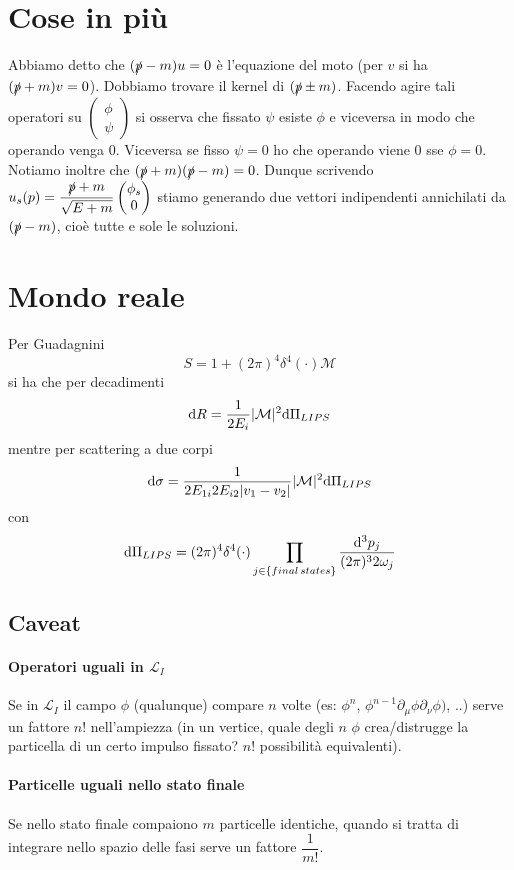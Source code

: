 \documentclass[12pt,a4paper]{article}
\begin{document}
	
	\section{Cose in più}
	Abbiamo detto che $(\slashed{p} -m)u=0$ è l'equazione del moto (per $v$ si ha $(\slashed{p}+m)v=0$). Dobbiamo trovare il kernel di $(\slashed{p}\pm m)$. Facendo agire tali operatori su $\begin{pmatrix}	\phi\\\psi	\end{pmatrix}$ si osserva che fissato $\psi$ esiste $\phi$ e viceversa in modo che operando venga 0. Viceversa se fisso $\psi=0$ ho che operando viene 0 sse $\phi=0$. Notiamo inoltre che $(\slashed{p}+m)(\slashed{p}-m) = 0$. Dunque scrivendo $u_s(p) = \dfrac{\slashed{p}+m}{\sqrt{E+m}} \begin{pmatrix}	\phi_s\\0	\end{pmatrix} $ stiamo generando due vettori indipendenti annichilati da $(\slashed{p}-m)$, cioè tutte e sole le soluzioni.
	
	\section{Mondo reale}
	Per Guadagnini
	\[ S = 1 + (2\pi)^4 \delta^4(\cdot) \mathcal{M} \]
	si ha che per decadimenti
	\[ \mathrm{d} R = \dfrac{1}{2E_i} |\mathcal{M}|^2 \mathrm{d} \Pi_{LIPS} \]
	mentre per scattering a due corpi
	\[ \mathrm{d} \sigma = \dfrac{1}{2 E_{1i} 2 E_{i2} |v_1 - v_2| } |\mathcal{M}|^2 \mathrm{d} \Pi_{LIPS} \]
	con
	\[ \mathrm{d} \Pi_{LIPS} = (2\pi)^4 \delta^4(\cdot) \prod_{j\in \{ final\,states \}} \dfrac{\mathrm{d}^3 p_j}{(2\pi)^3 2\omega_j} \]
	
	\subsection{Caveat}
	\paragraph{Operatori uguali in $\mathcal{L}_I$} Se in $\mathcal{L}_I$ il campo $\phi$ (qualunque) compare $n$ volte (es: $\phi^n$, $\phi^{n-1} \partial_\mu \phi \partial_\nu \phi)$, ..) serve un fattore $n!$ nell'ampiezza (in un vertice, quale degli $n$ $\phi$ crea/distrugge la particella di un certo impulso fissato? $n!$ possibilità equivalenti).
	
	\paragraph{Particelle uguali nello stato finale} Se nello stato finale compaiono $m$ particelle identiche, quando si tratta di integrare nello spazio delle fasi serve un fattore $\dfrac{1}{m!}$.
	
\end{document}
